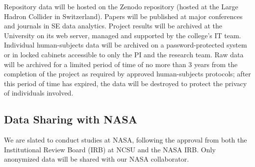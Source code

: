 Repository data will be hosted on the Zenodo repository (hosted at the Large Hadron Collider in Switzerland). Papers will be published at major conferences and journals in SE data analytics.
Project results will be archived at the University on its web server, managed and supported by the college’s IT team. Individual human-subjects data will be archived on a password-protected system or in locked cabinets accessible to only the PI and the research team. Raw data will be archived for a limited period of time of no more than 3 years from the completion of the project as required by approved human-subjects protocols; after this period of time has expired, the data will be destroyed to protect the privacy of individuals involved.


\subsection{Data Sharing with NASA}
We are slated to conduct studies at NASA, following the approval from both the Institutional Review Board (IRB) at NCSU and the NASA IRB. Only anonymized data will be shared with our NASA collaborator.